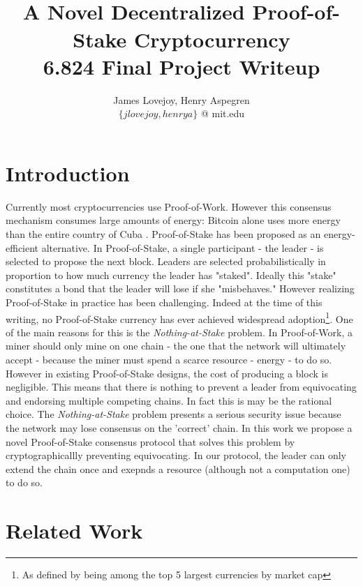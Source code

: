 \documentclass{article}
\begin{document}
\title{%
  \coin \\ 
  A Novel Decentralized Proof-of-Stake Cryptocurrency\\
  \large 6.824 Final Project Writeup}
\author{James Lovejoy, Henry Aspegren \\ $\{ jlovejoy, henrya \}$ @ mit.edu}
\maketitle

\section{Introduction}
Currently most cryptocurrencies use Proof-of-Work. However this consensus mechanism consumes large amounts of energy: Bitcoin alone uses more energy than the entire country of Cuba \cite{energy}. Proof-of-Stake has been proposed as an energy-efficient alternative. In Proof-of-Stake, a single participant - the leader - is selected to propose the next block. Leaders are selected probabilistically in proportion to how much currency the leader has "staked". Ideally this "stake" constitutes a bond that the leader will lose if she "misbehaves." However realizing Proof-of-Stake in practice has been challenging. Indeed at the time of this writing, no Proof-of-Stake currency has ever achieved widespread adoption\footnote{As defined by being among the top 5 largest currencies by market cap}. One of the main reasons for this is the \textit{Nothing-at-Stake} problem. In Proof-of-Work, a miner should only mine on one chain - the one that the network will ultimately accept - because the miner must spend a scarce resource - energy - to do so. However in existing Proof-of-Stake designs, the cost of producing a block is negligible. This means that there is nothing to prevent a leader from equivocating and endorsing multiple competing chains. In fact this is may be the rational choice. The \textit{Nothing-at-Stake} problem presents a serious security issue because the network may lose consensus on the 'correct' chain. In this work we propose a novel Proof-of-Stake consensus protocol that solves this problem by cryptographicallly preventing equivocating. In our protocol, the leader can only extend the chain once and exepnds a resource (although not a computation one) to do so. 

\section{Related Work}
\end{document}
